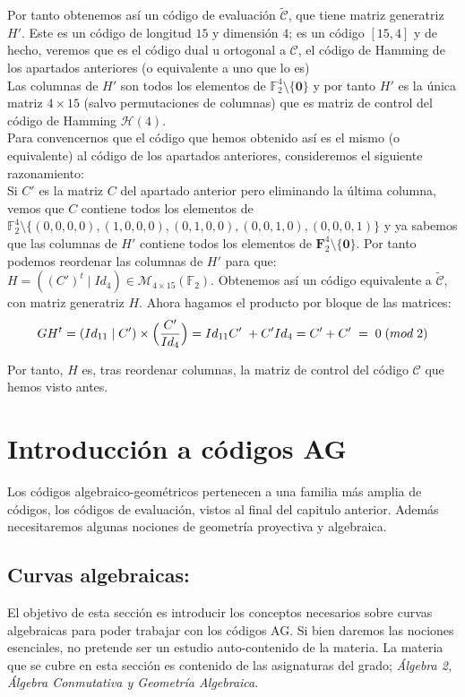 \documentclass[11pt,spanish]{book}
\begin{document}
Por tanto obtenemos así un código de evaluación $\tilde{\mathcal{C}}$, que tiene matriz generatriz $H'$. Este es un código de longitud $15$ y dimensión $4$; es un código $[15,4]$ y de hecho, veremos que es el código dual u ortogonal a $\mathcal{C}$, el código de Hamming de los apartados anteriores (o equivalente a uno que lo es) \\

Las columnas de $H'$ son todos los elementos de $\mathbb{F}_2^{4}\setminus\{\mathbf{0}\}$ y por tanto $H'$ es la única matriz $4\times 15$ (salvo permutaciones de columnas) que es matriz de control del código de Hamming $\mathcal{H}(4)$.\\

Para convencernos que el código que hemos obtenido así es el mismo (o equivalente) al código de los apartados anteriores, consideremos el siguiente razonamiento:\\

Si $C'$ es la matriz $C$ del apartado anterior pero eliminando la última columna, vemos que $C$ contiene todos los elementos de $\mathbb{F}_2^{4}\setminus\{(0,0,0,0),(1,0,0,0),(0,1,0,0),(0,0,1,0),(0,0,0,1)\}$ y ya sabemos que las columnas de $H'$ contiene todos los elementos de $\mathbf{F}_2^{4}\setminus\{\mathbf{0}\}$. Por tanto podemos reordenar las columnas de $H'$ para que: $H=((C')^{t}\;|\;Id_{4})\in \mathcal{M}_{4\times 15}(\mathbb{F}_2)$. Obtenemos así un código equivalente a $\tilde{\mathcal{C}}$, con matriz generatriz $H$. Ahora hagamos el producto por bloque de las matrices:
$$GH^t=(Id_{11}\;|\;C')\times \Big{(}\frac{C'}{Id_{4}}\Big{)} = Id_{11}C'\;+C'Id_{4}=C'+C'\;=\;0\;(mod\; 2)$$

Por tanto, $H$ es, tras reordenar columnas, la matriz de control del código $\mathcal{C}$ que hemos visto antes.



\chapter{Introducción a códigos AG}
Los códigos algebraico-geométricos pertenecen a una familia más amplia de códigos, los códigos de evaluación, vistos al final del capitulo anterior. Además necesitaremos algunas nociones de geometría proyectiva y algebraica.\\
\section{Curvas algebraicas:}
El objetivo de esta sección es introducir los conceptos necesarios sobre curvas algebraicas para poder trabajar con los códigos AG. Si bien daremos las nociones esenciales, no pretende ser un estudio auto-contenido de la materia. La materia que se cubre en esta sección es contenido de las asignaturas del grado; \textit{Álgebra 2, Álgebra Conmutativa y Geometría Algebraica}.\\
\end{document}
